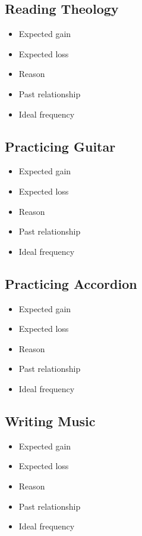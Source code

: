 \documentclass[12pt]{article}
\renewcommand{\,}{\textsuperscript{,}}
\begin{document}
\subsection{Reading Theology}
\begin{itemize}
    \item Expected gain
    \item Expected loss
    \item Reason
    \item Past relationship
    \item Ideal frequency

\end{itemize}

\subsection{Practicing Guitar}
\begin{itemize}
    \item Expected gain
    \item Expected loss
    \item Reason
    \item Past relationship
    \item Ideal frequency

\end{itemize}

\subsection{Practicing Accordion}
\begin{itemize}
    \item Expected gain
    \item Expected loss
    \item Reason
    \item Past relationship
    \item Ideal frequency

\end{itemize}

\subsection{Writing Music}
\begin{itemize}
    \item Expected gain
    \item Expected loss
    \item Reason
    \item Past relationship
    \item Ideal frequency

\end{itemize}
\end{document}
